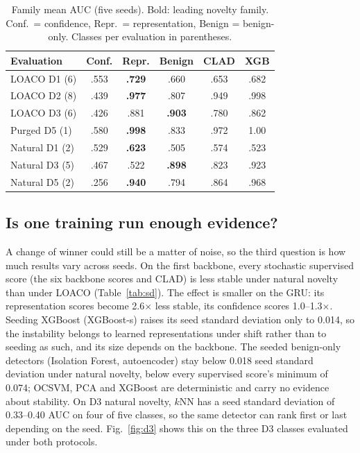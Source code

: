 \documentclass[conference]{IEEEtran}
\begin{document}
\begin{table}[!t]
\centering\footnotesize\setlength{\tabcolsep}{2.4pt}
\caption{Family mean AUC (five seeds). Bold: leading novelty family. Conf.\ = confidence, Repr.\ = representation, Benign = benign-only. Classes per evaluation in parentheses.}
\label{tab:fam}
\begin{tabular}{lccccc}
\toprule
Evaluation & Conf. & Repr. & Benign & CLAD & XGB\\
\midrule
LOACO D1 (6) & .553 & \textbf{.729} & .660 & .653 & .682\\
LOACO D2 (8) & .439 & \textbf{.977} & .807 & .949 & .998\\
LOACO D3 (6) & .426 & .881 & \textbf{.903} & .780 & .862\\
Purged D5 (1) & .580 & \textbf{.998} & .833 & .972 & 1.00\\
Natural D1 (2) & .529 & \textbf{.623} & .505 & .574 & .523\\
Natural D3 (5) & .467 & .522 & \textbf{.898} & .823 & .923\\
Natural D5 (2) & .256 & \textbf{.940} & .794 & .864 & .968\\
\bottomrule
\end{tabular}
\end{table}

\subsection{Is one training run enough evidence?}
\label{sec:c3}
A change of winner could still be a matter of noise, so the third question is how much results vary across seeds. On the first backbone, every stochastic supervised score (the six backbone scores and CLAD) is less stable under natural novelty than under LOACO (Table~\ref{tab:sd}). The effect is smaller on the GRU: its representation scores become 2.6$\times$ less stable, its confidence scores 1.0--1.3$\times$. Seeding XGBoost (XGBoost-s) raises its seed standard deviation only to 0.014, so the instability belongs to learned representations under shift rather than to seeding as such, and its size depends on the backbone. The seeded benign-only detectors (Isolation Forest, autoencoder) stay below 0.018 seed standard deviation under natural novelty, below every supervised score's minimum of 0.074; OCSVM, PCA and XGBoost are deterministic and carry no evidence about stability. On D3 natural novelty, $k$NN has a seed standard deviation of 0.33--0.40 AUC on four of five classes, so the same detector can rank first or last depending on the seed. Fig.~\ref{fig:d3} shows this on the three D3 classes evaluated under both protocols.
\end{document}
